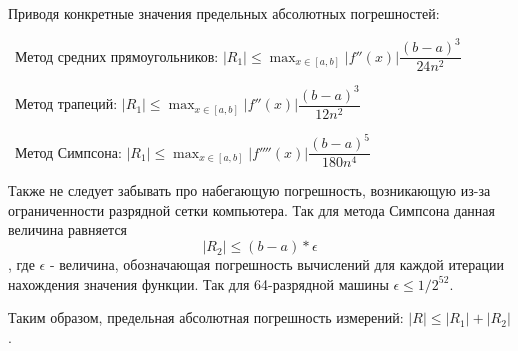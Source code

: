 \documentclass[11pt, a4paper]{article}
\newcommand{\abs}[1]{\left\lvert#1\right\rvert}
\begin{document}
\smallskip
Приводя конкретные значения предельных абсолютных погрешностей:

\smallskip
\textbullet~Метод средних прямоугольников: $\abs{R_1} \le \max_{x \in [a, b]}\abs{f''(x)} \dfrac{(b-a)^3}{24 n^2}$

\smallskip
\textbullet~Метод трапеций: $\abs{R_1} \le \max_{x \in [a, b]}\abs{f''(x)} \dfrac{(b-a)^3}{12 n^2}$

\smallskip
\textbullet~Метод Симпсона: $\abs{R_1} \le \max_{x \in [a, b]}\abs{f''''(x)} \dfrac{(b-a)^5}{180 n^4}$

\medskip
Также не следует забывать про набегающую погрешность, возникающую из-за ограниченности разрядной
сетки компьютера. Так для метода Симпсона данная величина равняется
\begin{equation*}
  \abs{R_2} \le (b - a) * \epsilon
\end{equation*}, где $\epsilon$ - величина, обозначающая погрешность вычислений для каждой итерации нахождения значения функции. Так для 64-разрядной
машины $\epsilon \le 1/2^{52}$.

\medskip
Таким образом, предельная абсолютная погрешность измерений: $\abs{R} \le \abs{R_1} + \abs{R_2}$.
\end{document}

